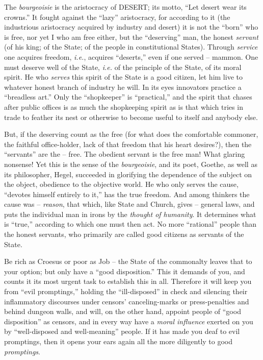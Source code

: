 The \textit{bourgeoisie} is the aristocracy of DESERT; its motto, ``Let 
desert wear its crowns.'' It fought against the ``lazy'' aristocracy, for 
according to it (the industrious aristocracy acquired by industry and desert) 
it is not the ``born'' who is free, nor yet I who am free either, but the 
``deserving'' man, the honest \textit{servant} (of his king; of the State; 
of the people in constitutional States). Through \textit{service} one acquires 
freedom, \textit{i.e.}, acquires ``deserts,'' even if one served -- mammon. 
One must deserve well of the State, \textit{i.e.} of the principle of the 
State, of its moral spirit. He who \textit{serves} this spirit of the State is 
a good citizen, let him live to whatever honest branch of industry he will. In 
its eyes innovators practice a ``breadless art.'' Only the ``shopkeeper'' 
is ``practical,'' and the spirit that chases after public offices is as much 
the shopkeeping spirit as is that which tries in trade to feather its nest or 
otherwise to become useful to itself and anybody else.

But, if the deserving count as the free (for what does the comfortable 
commoner, the faithful office-holder, lack of that freedom that his heart 
desires?), then the ``servants'' are the -- free. The obedient servant is 
the free man! What glaring nonsense! Yet this is the sense of the 
\textit{bourgeoisie}, and its poet, Goethe, as well as its philosopher, Hegel, 
succeeded in glorifying the dependence of the subject on the object, obedience 
to the objective world. He who only serves the cause, ``devotes himself 
entirely to it,'' has the true freedom. And among thinkers the cause was -- 
\textit{reason}, that which, like State and Church, gives -- general laws, and 
puts the individual man in irons by the \textit{thought of humanity}. It 
determines what is ``true,'' according to which one must then act. No more 
``rational'' people than the honest servants, who primarily are called good 
citizens as servants of the State.

Be rich as Croesus or poor as Job -- the State of the commonalty leaves that 
to your option; but only have a ``good disposition.'' This it demands of 
you, and counts it its most urgent task to establish this in all. Therefore it 
will keep you from ``evil promptings,'' holding the ``ill-disposed'' in 
check and silencing their inflammatory discourses under censors' 
canceling-marks or press-penalties and behind dungeon walls, and will, on the 
other hand, appoint people of ``good disposition'' as censors, and in every 
way have a \textit{moral influence} exerted on you by ``well-disposed and 
well-meaning'' people. If it has made you deaf to evil promptings, then it 
opens your ears again all the more diligently to good \textit{promptings}.

